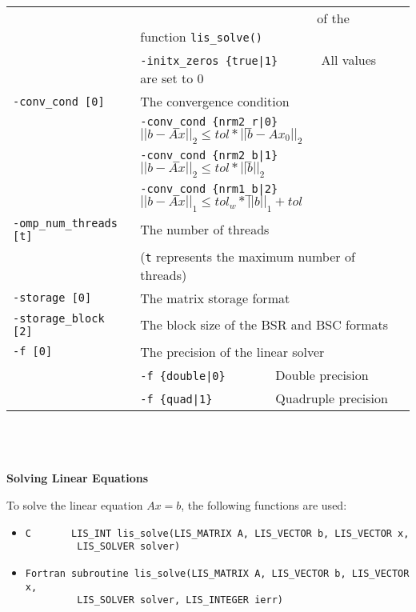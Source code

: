 \documentclass[a4paper]{article}
\begin{document}
\begin{minipage}[t]{\textwidth}
\begin{center}
\begin{tabular}{l|ll}
                       & \verb=                           =  of the function \verb=lis_solve()= \\
                       & \verb=-initx_zeros {true|1}      =  All values are set to $0$ \\
\verb=-conv_cond [0]= & The convergence condition  \\
                       & \verb=-conv_cond {nrm2_r|0}     =  $||b-Ax||_2 \le tol * ||b-Ax_0||_2$ \\
                       & \verb=-conv_cond {nrm2_b|1}     =  $||b-Ax||_2 \le tol * ||b||_2$ \\
                       & \verb=-conv_cond {nrm1_b|2}     =  $||b-Ax||_1 \le tol_w * ||b||_1 + tol$\\
\verb=-omp_num_threads [t]= & The number of threads        \\ 
                            & (\verb=t= represents the maximum number of
 threads) \\
\verb=-storage [0]=    & The matrix storage format \\
\verb=-storage_block [2]=& The block size of the BSR and BSC formats\\ 
\verb=-f [0]=          & The precision of the linear solver\\
                       & \verb=-f {double|0}       =  Double precision \\ 
                       & \verb=-f {quad|1}         =  Quadruple precision \\
\hline         
\end{tabular}
\end{center}
\end{minipage}
\\ \\ \\
\noindent
{\bf Solving Linear Equations}

To solve the linear equation $Ax = b$, the following functions are used:
\begin{itemize}
\item \verb|C       LIS_INT lis_solve(LIS_MATRIX A, LIS_VECTOR b, LIS_VECTOR x,|\\
      \verb|         LIS_SOLVER solver)|
\item \verb|Fortran subroutine lis_solve(LIS_MATRIX A, LIS_VECTOR b, LIS_VECTOR x,|\\
      \verb|         LIS_SOLVER solver, LIS_INTEGER ierr)|
\end{itemize}
\end{document}
